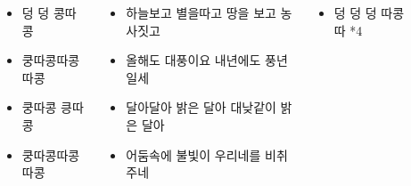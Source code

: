 \documentclass[20pt, a1paper ]{tikzposter}
\begin{document}
\begin{columns}
{		}

		{
			\setlength{\leftmargini}{2em}			
			\setlength{\labelsep}{1em} 
			\begin{Large}
			\begin{itemize}

			\item 덩 덩 콩따콩
			\item 쿵따콩따콩따콩
			\item 쿵따콩 킁따콩
			\item 쿵따콩따콩따콩

			\end{itemize}
			\end{Large}
		}






		{

			\setlength{\leftmargini}{2em}			
			\setlength{\labelsep}{1em} 
			\begin{Large}
			\begin{itemize}

			\item 하늘보고 별을따고 땅을 보고 농사짓고
			\item 올해도 대풍이요 내년에도 풍년일세
			\item 달아달아 밝은 달아 대낮같이 밝은 달아
			\item 어둠속에 불빛이 우리네를 비취주네

			\end{itemize}
			\end{Large}
		}


		{
			\setlength{\leftmargini}{2em}			
			\setlength{\labelsep}{1em} 
			\begin{Large}
			\begin{itemize}

			\item 덩 덩 덩 따콩따 *4

			\end{itemize}
			\end{Large}
		}

		{
			\setlength{\leftmargini}{2em}			
			\setlength{\labelsep}{1em} 
			\begin{Large}
			\begin{itemize}


\end{itemize}
\end{Large}}
\end{columns}
\end{document}

